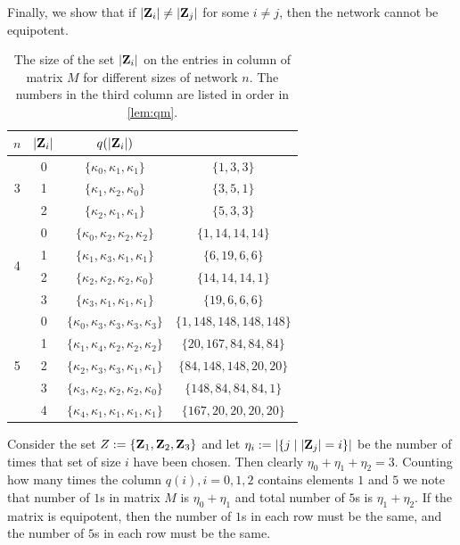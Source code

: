 \documentclass[12pt]{amsart}
\newcommand{\bZ}{{\bf Z}}
\theoremstyle{definition}
\begin{document}
Finally, we show that if $|\bZ_i| \not =|\bZ_j| $ for some $i\not = j$, then the network cannot be equipotent.

\begin{table}[t]
     \centering
    \begin{tabular}{|c|c|c|c|}
    \hline
    $n$ & $|\bZ_i|$ & $q(|\bZ_i|)$ &   \\
    \hline 
    \multirow{3}{*}{3} & 0 & $\{\kappa_0,\kappa_1,\kappa_1\}$ & $\{1,3,3\}$ \\
     & 1 & $\{\kappa_1,\kappa_2,\kappa_0\}$ & $\{3,5,1\}$ \\
     & 2 & $\{\kappa_2,\kappa_1,\kappa_1\}$ & $\{5,3,3\}$ \\
    \hline
    \multirow{4}{*}{4} & 0 & $\{\kappa_0,\kappa_2,\kappa_2,\kappa_2\}$ & $\{1,14,14,14\}$ \\
    & 1 & $\{\kappa_1,\kappa_3,\kappa_1,\kappa_1\}$ & $\{6,19,6,6\} $ \\
    & 2 & $\{\kappa_2,\kappa_2,\kappa_2,\kappa_0\}$ & $\{14,14,14,1\}$ \\
    & 3 & $\{\kappa_3,\kappa_1,\kappa_1,\kappa_1\}$ & $\{19,6,6,6\} $ \\
    \hline
    \multirow{5}{*}{5} & 0 & $\{\kappa_0,\kappa_3,\kappa_3,\kappa_3,\kappa_3\}$ & $\{1,148,148,148,148\}$  \\
     & 1 &  $\{\kappa_1,\kappa_4,\kappa_2,\kappa_2,\kappa_2\}$ & $\{20,167,84,84,84\} $ \\
     & 2 &   $\{\kappa_2,\kappa_3,\kappa_3,\kappa_1,\kappa_1\}$ & $\{84,148,148,20,20\}$  \\
     & 3  &  $\{\kappa_3,\kappa_2,\kappa_2,\kappa_2,\kappa_0\}$ & $\{148,84,84,84,1\} $ \\
     & 4  &  $\{\kappa_4,\kappa_1,\kappa_1,\kappa_1,\kappa_1\}$ & $\{167,20,20,20,20\} $ \\
    \hline
    \end{tabular}
    \caption{The size of the set $|\bZ_i|$ on the entries in column of matrix $M$ for different sizes of network $n$. The numbers in the third column are listed in order in \cref{lem:qm}. }
    \label{tablecolumnsM1} 
\end{table}

Consider the set $Z:= \{ \bZ_1, \bZ_2, \bZ_3\}$ and let $\eta_i:= |\{j\;|\;|\bZ_j|=i \}| $ be the number of times that set of size $i$ have been chosen.  Then clearly $\eta_0+\eta_1+\eta_2=3$. 
Counting how many times the column $q(i), i=0,1,2$ contains elements $1$ and $5$ we note that 
number of $1$s in matrix $M$ is $\eta_0 + \eta_1$ and total number of $5$s is $\eta_1 + \eta_2$. If the matrix is equipotent, then the number of $1$s in each row must be the same, and the number of $5$s in each row must be the same.
\end{document}
